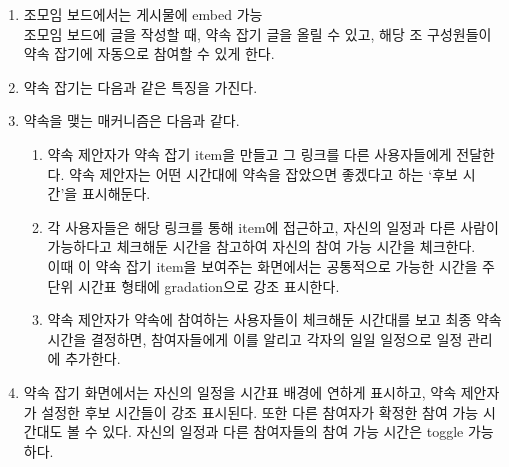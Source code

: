 \documentclass[a4paper,titlepage]{article}
\begin{document}
\begin{funcreq}
\begin{enumerate}
		\item 조모임 보드에서는 게시물에 embed 가능\\
		조모임 보드에 글을 작성할 때, 약속 잡기 글을 올릴 수 있고, 해당 조 구성원들이 약속 잡기에 자동으로 참여할 수 있게 한다.
		\item 약속 잡기는 다음과 같은 특징을 가진다.
		\item 약속을 맺는 매커니즘은 다음과 같다.
		\begin{enumerate}
			\item 약속 제안자가 약속 잡기 item을 만들고 그 링크를 다른 사용자들에게 전달한다.
			약속 제안자는 어떤 시간대에 약속을 잡았으면 좋겠다고 하는 `후보 시간'을 표시해둔다.
			\item 각 사용자들은 해당 링크를 통해 item에 접근하고, 자신의 일정과 다른 사람이 가능하다고 체크해둔 시간을 참고하여 자신의 참여 가능 시간을 체크한다.\\
			이때 이 약속 잡기 item을 보여주는 화면에서는 공통적으로 가능한 시간을 주 단위 시간표 형태에 gradation으로 강조 표시한다.
			\item 약속 제안자가 약속에 참여하는 사용자들이 체크해둔 시간대를 보고 최종 약속 시간을 결정하면, 참여자들에게 이를 알리고 각자의 일일 일정으로 일정 관리에 추가한다. 
		\end{enumerate}
		\item 약속 잡기 화면에서는 자신의 일정을 시간표 배경에 연하게 표시하고, 약속 제안자가 설정한 후보 시간들이 강조 표시된다.
		또한 다른 참여자가 확정한 참여 가능 시간대도 볼 수 있다. 자신의 일정과 다른 참여자들의 참여 가능 시간은 toggle 가능하다.
	\end{enumerate}
\end{funcreq}
\end{document}
